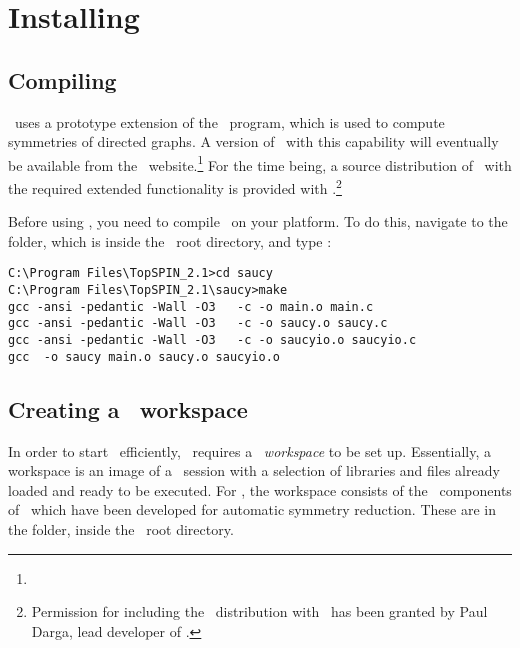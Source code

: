 \section{Installing}\label{sec:downloadandinstall:installation}

\subsection{Compiling \saucy}\label{sec:downloadandinstall:installation:compilingsaucy}

\topspin\ uses a prototype extension of the \saucy\ program, which
is used to compute symmetries of directed graphs.  A version of
\saucy\ with this capability will eventually be available from the
\saucy\ website.\footnote{\texttt{\saucywebpage}} For the time
being, a source distribution of \saucy\ with the required extended
functionality is provided with \topspin.\footnote{Permission for
including the \saucy\ distribution with \topspin\ has been granted
by Paul Darga, lead developer of \saucy.}

Before using \topspin, you need to compile \saucy\ on your platform.
To do this, navigate to the  folder, which is inside
the \topspin\ root directory, and type :
%
\begin{lstlisting}
C:\Program Files\TopSPIN_2.1>cd saucy
C:\Program Files\TopSPIN_2.1\saucy>make
gcc -ansi -pedantic -Wall -O3   -c -o main.o main.c
gcc -ansi -pedantic -Wall -O3   -c -o saucy.o saucy.c
gcc -ansi -pedantic -Wall -O3   -c -o saucyio.o saucyio.c
gcc  -o saucy main.o saucy.o saucyio.o
\end{lstlisting}
%
\subsection{Creating a \protect\gap\ workspace}\label{sec:downloadandinstall:gapworkspace}
%
In order to start \gap\ efficiently, \topspin\ requires a \gap\
\emph{workspace} to be set up.  Essentially, a workspace is an image
of a \gap\ session with a selection of libraries and files already
loaded and ready to be executed.  For \topspin, the workspace
consists of the \gap\ components of \topspin\ which have been
developed for automatic symmetry reduction.  These are in the
 folder, inside the \topspin\ root directory.

